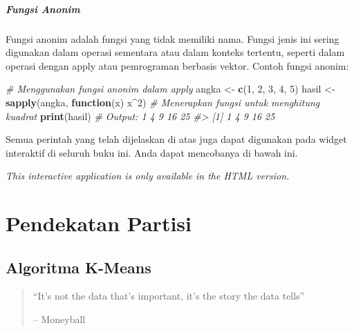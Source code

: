 \documentclass[
  oneside]{book}
\newenvironment{Shaded}{\begin{snugshade}}{\end{snugshade}}
\newcommand{\CommentTok}[1]{\textcolor[rgb]{0.56,0.35,0.01}{\textit{#1}}}
\newcommand{\ControlFlowTok}[1]{\textcolor[rgb]{0.13,0.29,0.53}{\textbf{#1}}}
\newcommand{\DecValTok}[1]{\textcolor[rgb]{0.00,0.00,0.81}{#1}}
\newcommand{\FunctionTok}[1]{\textcolor[rgb]{0.13,0.29,0.53}{\textbf{#1}}}
\newcommand{\NormalTok}[1]{#1}
\newcommand{\OtherTok}[1]{\textcolor[rgb]{0.56,0.35,0.01}{#1}}
\newcommand{\SpecialCharTok}[1]{\textcolor[rgb]{0.81,0.36,0.00}{\textbf{#1}}}
\begin{document}
\subsubsection*{Fungsi Anonim}\label{fungsi-anonim}

Fungsi anonim adalah fungsi yang tidak memiliki nama. Fungsi jenis ini sering digunakan dalam operasi sementara atau dalam konteks tertentu, seperti dalam operasi dengan apply atau pemrograman berbasis vektor. Contoh fungsi anonim:

\begin{Shaded}
\begin{Highlighting}[]
\CommentTok{\# Menggunakan fungsi anonim dalam apply}
\NormalTok{angka }\OtherTok{\textless{}{-}} \FunctionTok{c}\NormalTok{(}\DecValTok{1}\NormalTok{, }\DecValTok{2}\NormalTok{, }\DecValTok{3}\NormalTok{, }\DecValTok{4}\NormalTok{, }\DecValTok{5}\NormalTok{)}
\NormalTok{hasil }\OtherTok{\textless{}{-}} \FunctionTok{sapply}\NormalTok{(angka, }\ControlFlowTok{function}\NormalTok{(x) x}\SpecialCharTok{\^{}}\DecValTok{2}\NormalTok{)  }\CommentTok{\# Menerapkan fungsi untuk menghitung kuadrat}
\FunctionTok{print}\NormalTok{(hasil)  }\CommentTok{\# Output: 1 4 9 16 25}
\CommentTok{\#\textgreater{} [1]  1  4  9 16 25}
\end{Highlighting}
\end{Shaded}

Semua perintah yang telah dijelaskan di atas juga dapat
digunakan pada widget interaktif di seluruh buku ini. Anda dapat
mencobanya di bawah ini.

\begin{center}
\textit{This interactive application is only available in the HTML version.}
\end{center}

\part{Pendekatan Partisi}\label{part-pendekatan-partisi}

\chapter{Algoritma K-Means}\label{km}

\begin{quote}
``It's not the data that's important, it's the story the data tells''

-- Moneyball
\end{quote}
\end{document}
